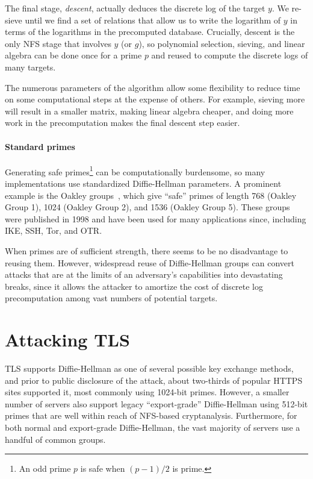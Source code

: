 The final stage, \emph{descent}, actually deduces the discrete log of the
target $y$. We re-sieve until we find a set of relations that allow us to
write the logarithm of $y$ in terms of the logarithms in the precomputed
database. Crucially, descent is the only NFS stage that involves $y$ (or
$g$), so polynomial selection, sieving, and linear algebra can be done once
for a prime $p$ and reused to compute the discrete logs of many targets.

The numerous parameters of the algorithm allow some flexibility to reduce
time on some computational steps at the expense of others. For example,
sieving more will result in a smaller matrix, making linear algebra cheaper,
and doing more work in the precomputation makes the final descent step
easier.

\paragraph{Standard primes}
Generating safe primes\footnote{\small An odd prime $p$ is safe when
$(p-1)/2$ is prime.} can be computationally burdensome, so many
implementations use standardized Diffie-Hellman parameters. A prominent
example is the Oakley groups~\cite{rfc2412}, which give ``safe'' primes of
length 768 (Oakley Group 1), 1024 (Oakley Group 2), and 1536 (Oakley Group
5). These groups were published in 1998 and have been used for many
applications since, including IKE, SSH, Tor, and OTR\@.

When primes are of sufficient strength, there seems to be no
disadvantage to reusing them.  However, widespread reuse of
Diffie-Hellman groups can convert attacks that are at the limits of an
adversary's capabilities into devastating breaks, since it allows the
attacker to amortize the cost of discrete log precomputation among
vast numbers of potential targets.


\section{Attacking TLS}
\label{sec:tls}

TLS supports Diffie-Hellman as one of several possible key exchange
methods, and prior to public disclosure of the attack, about two-thirds of popular HTTPS sites supported it, most
commonly using 1024-bit primes.  However, a smaller number of servers
also support legacy ``export-grade'' Diffie-Hellman using 512-bit
primes that are well within reach of NFS-based
cryptanalysis. Furthermore, for both normal and export-grade
Diffie-Hellman, the vast majority of servers use a handful of common
groups.


